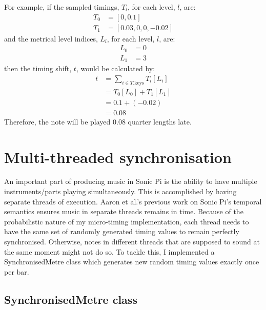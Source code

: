 \documentclass[12pt,twoside,openright]{report}
\begin{document}
For example, if the sampled timings, $T_l$, for each level, $l$, are:
\begin{equation*}
    \begin{split}
        T_0 &= [0,0.1] \\
        T_1 &= [0.03,0,0,-0.02]
    \end{split}
\end{equation*}
and the metrical level indices, $L_l$, for each level, $l$, are:
\begin{equation*}
    \begin{split}
        L_0 &= 0 \\
        L_1 &= 3
    \end{split}
\end{equation*}
then the timing shift, $t$, would be calculated by:
\begin{equation*}
    \begin{split}
        t &= \sum_{i \in T.\mathrm{keys}} T_i[L_i] \\
        &=T_0[L_0]+T_1[L_1] \\
        &=0.1+(-0.02) \\
        &=0.08
    \end{split}
\end{equation*}
Therefore, the note will be played 0.08 quarter lengths late.



\section{Multi-threaded synchronisation} \label{multi-threaded_synchronisation}

An important part of producing music in Sonic Pi is the ability to have multiple
instruments/parts playing simultaneously. This is accomplished by having
separate threads of execution. Aaron et al.'s previous work on Sonic Pi's
temporal semantics \cite{aaron2014} ensures music in separate threads remains in time.
Because of the probabilistic nature of my micro-timing implementation, each
thread needs to have the same set of randomly generated timing values to remain
perfectly synchronised. Otherwise, notes in different threads that are supposed
to sound at the same moment might not do so. To tackle this, I implemented a
SynchronisedMetre class which generates new random timing values exactly once
per bar.


\subsection{SynchronisedMetre class} \label{synchronised_metre}
\end{document}
